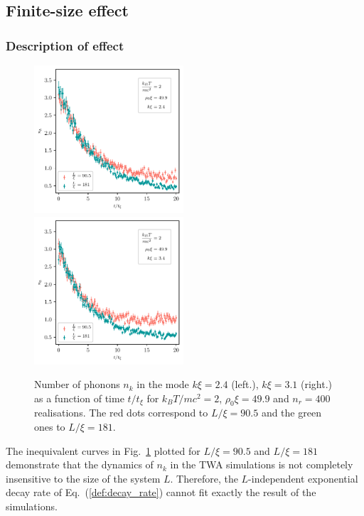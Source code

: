 \documentclass[aps,prd,notitlepage,amsfonts,amssymb,amsmath,nofootinbib,superscriptaddress,longbibliography]{revtex4-2}
\begin{document}
\begin{appendices}
\subsection{Finite-size effect}
\label{subsubsec:finite_size_effect}


\subsubsection{Description of effect}


\begin{figure}
    \centering
    \includegraphics[width=0.495\textwidth]{fig11a.pdf}
    \includegraphics[width=0.495\textwidth]{fig11b.pdf}
    \caption{Number of phonons $n_k$ in the mode $k \xi = 2.4$ (left.), $k \xi = 3.1$ (right.) as a function of time $t /t_{\xi}$ for $k_{B} T/ m c^2=2$, $\rho_0 \xi = 49.9$ and $n_r = 400$ realisations. The red dots correspond to $L/\xi = 90.5$ and the green ones to $L/\xi = 181$.
    \label{fig:decay_nk_different_L} }
\end{figure}

The inequivalent curves in Fig.~\ref{fig:decay_nk_different_L} plotted for $L / \xi = 90.5$ and $L / \xi = 181$ demonstrate that the dynamics of $n_k$ in the TWA simulations is not completely insensitive to the size of the system $L$. Therefore, the $L$-independent exponential decay rate of Eq.~(\ref{def:decay_rate}) cannot fit exactly the result of the simulations. 


\end{appendices}
\end{document}

